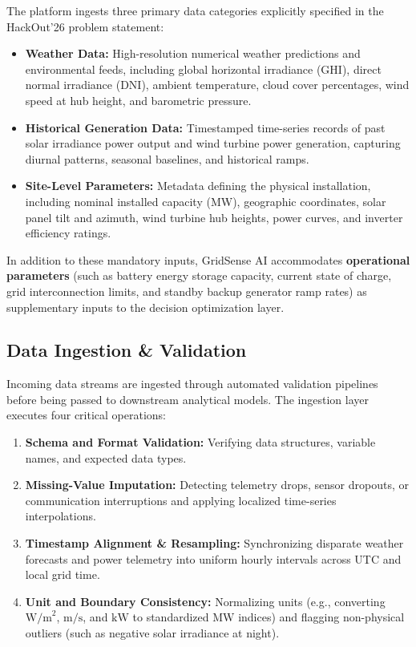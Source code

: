 The platform ingests three primary data categories explicitly specified in the HackOut'26 problem statement:
\begin{itemize}[leftmargin=1.8em, itemsep=0.25em]
    \item \textbf{Weather Data:} High-resolution numerical weather predictions and environmental feeds, including global horizontal irradiance (GHI), direct normal irradiance (DNI), ambient temperature, cloud cover percentages, wind speed at hub height, and barometric pressure.
    \item \textbf{Historical Generation Data:} Timestamped time-series records of past solar irradiance power output and wind turbine power generation, capturing diurnal patterns, seasonal baselines, and historical ramps.
    \item \textbf{Site-Level Parameters:} Metadata defining the physical installation, including nominal installed capacity (MW), geographic coordinates, solar panel tilt and azimuth, wind turbine hub heights, power curves, and inverter efficiency ratings.
\end{itemize}

In addition to these mandatory inputs, GridSense AI accommodates \textbf{operational parameters} (such as battery energy storage capacity, current state of charge, grid interconnection limits, and standby backup generator ramp rates) as supplementary inputs to the decision optimization layer.

\subsection{Data Ingestion \& Validation}
\label{subsec:data_ingestion}

Incoming data streams are ingested through automated validation pipelines before being passed to downstream analytical models. The ingestion layer executes four critical operations:
\begin{enumerate}[leftmargin=1.8em, itemsep=0.2em]
    \item \textbf{Schema and Format Validation:} Verifying data structures, variable names, and expected data types.
    \item \textbf{Missing-Value Imputation:} Detecting telemetry drops, sensor dropouts, or communication interruptions and applying localized time-series interpolations.
    \item \textbf{Timestamp Alignment \& Resampling:} Synchronizing disparate weather forecasts and power telemetry into uniform hourly intervals across UTC and local grid time.
    \item \textbf{Unit and Boundary Consistency:} Normalizing units (e.g., converting $\text{W/m}^2$, $\text{m/s}$, and $\text{kW}$ to standardized $\text{MW}$ indices) and flagging non-physical outliers (such as negative solar irradiance at night).
\end{enumerate}

